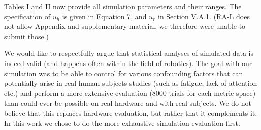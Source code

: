\documentclass[a4paper,twoside,11pt]{reviewresponse}
\begin{document}
%
%


Tables I and II now provide all simulation parameters and their ranges. 
The specification of $u_h$ is given in Equation 7, and $u_r$ in Section 
V.A.1. (RA-L does not allow Appendix and supplementary material, we 
therefore were unable to submit those.)



We would like to respectfully argue that statistical analyses of 
simulated data is indeed valid (and happens often within the field of 
robotics). The goal with our simulation was to be able to control for 
various confounding factors that can potentially arise in real human subjects studies (such as fatigue, lack of attention etc.) and perform a more 
extensive evaluation (8000 trials for each metric space) than could ever be possible on real 
hardware and with real subjects. We do not believe that this replaces hardware evaluation, but 
rather that it complements it. In this work we chose to do the more 
exhaustive simulation evaluation first.
\end{document}
